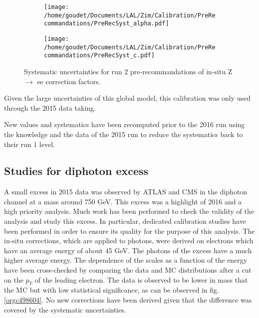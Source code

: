 \begin{figure}
\begin{subfigure}[t]{0.49\linewidth}
\begin{center}
\texttt{[image: /home/goudet/Documents/LAL/Zim/Calibration/PreRecommandations/PreRecSyst\_alpha.pdf]}
\end{center}
\end{subfigure}
\begin{subfigure}[t]{0.49\linewidth}
\begin{center}
\texttt{[image: /home/goudet/Documents/LAL/Zim/Calibration/PreRecommandations/PreRecSyst\_c.pdf]}
\end{center}
\end{subfigure}
\caption{\label{org95bdf2b}
Systematic uncertainties for run 2 pre-recommandations of in-situ Z\(\rightarrow\) ee correction factors.}
\end{figure}

Given the large uncertainties of this global model, this calibration was only used through the 2015 data taking.

New values and systematics have been recomputed prior to the 2016 run using the knowledge and the data of the 2015 run to reduce the systematics back to their run 1 level.

\subsection{Studies for diphoton excess}
\label{sec:orgeabf89e}
\label{sec:calibration_scaleForExcess}

A small excess in 2015 data was observed by ATLAS \cite{ATLAS-CONF-2015-081} and CMS \cite{CMS-PAS-EXO-15-004} in the diphoton channel at a mass around 750 GeV.
This excess was a highlight of 2016 and a high priority analysis.
Much work has been performed to check the validity of the analysis and study this excess.
In particular, dedicated calibration studies have been performed in order to ensure its quality for the purpose of this analysis.
The in-situ corrections, which are applied to photons, were derived on electrons which have an average energy of about 45 GeV.
The photons of the excess have a much higher average energy.
The dependence of the scales as a function of the energy have been cross-checked by comparing the data and MC distributions after a cut on the $p_T$ of the leading electron.
The data is observed to be lower in mass that the MC but with low statistical significance, as can be observed in fig. \ref{orgc498604}.
No new corrections have been derived given that the difference was covered by the systematic uncertainties.

